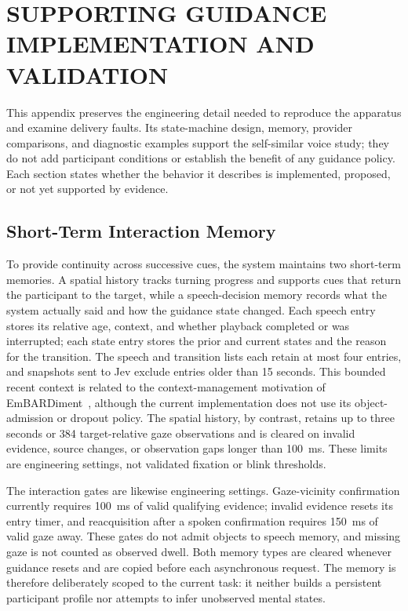 \chapter{SUPPORTING GUIDANCE IMPLEMENTATION AND VALIDATION}
\label{app:guidance-support}
This appendix preserves the engineering detail needed to reproduce the apparatus and examine delivery faults. Its state-machine design, memory, provider comparisons, and diagnostic examples support the self-similar voice study; they do not add participant conditions or establish the benefit of any guidance policy. Each section states whether the behavior it describes is implemented, proposed, or not yet supported by evidence.

\section{Short-Term Interaction Memory}
To provide continuity across successive cues, the system maintains two short-term memories. A spatial history tracks turning progress and supports cues that return the participant to the target, while a speech-decision memory records what the system actually said and how the guidance state changed. Each speech entry stores its relative age, context, and whether playback completed or was interrupted; each state entry stores the prior and current states and the reason for the transition. The speech and transition lists each retain at most four entries, and snapshots sent to Jev exclude entries older than 15 seconds. This bounded recent context is related to the context-management motivation of EmBARDiment~\cite{bovo2025embardiment}, although the current implementation does not use its object-admission or dropout policy. The spatial history, by contrast, retains up to three seconds or 384 target-relative gaze observations and is cleared on invalid evidence, source changes, or observation gaps longer than 100~ms. These limits are engineering settings, not validated fixation or blink thresholds.

The interaction gates are likewise engineering settings. Gaze-vicinity confirmation currently requires 100~ms of valid qualifying evidence; invalid evidence resets its entry timer, and reacquisition after a spoken confirmation requires 150~ms of valid gaze away. These gates do not admit objects to speech memory, and missing gaze is not counted as observed dwell. Both memory types are cleared whenever guidance resets and are copied before each asynchronous request. The memory is therefore deliberately scoped to the current task: it neither builds a persistent participant profile nor attempts to infer unobserved mental states.

